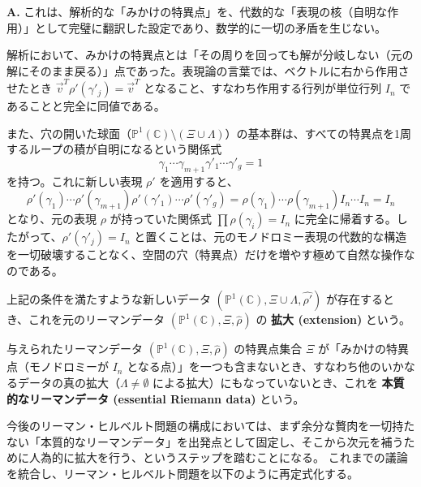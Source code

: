 \begin{Q}[【核心】新しく追加した点に対する表現を $\rho'(\gamma'_{j}) = I_{n}$ と設定することは、代数的にどのような意味を持つか？また、これは元の表現と矛盾しないか？]
\textbf{A.} これは、解析的な「みかけの特異点」を、代数的な「表現の核（自明な作用）」として完璧に翻訳した設定であり、数学的に一切の矛盾を生じない。

解析において、みかけの特異点とは「その周りを回っても解が分岐しない（元の解にそのまま戻る）」点であった。表現論の言葉では、ベクトルに右から作用させたとき $\vec{v}^T \rho'(\gamma'_j) = \vec{v}^T$ となること、すなわち作用する行列が単位行列 $I_n$ であることと完全に同値である。

また、穴の開いた球面（$\mathbb{P}^{1}(\mathbb{C})\setminus (\Xi\cup\Lambda)$）の基本群は、すべての特異点を1周するループの積が自明になるという関係式
\[
\gamma_{1} \cdots \gamma_{m+1} \gamma'_{1} \cdots \gamma'_{g} = 1
\]
を持つ。これに新しい表現 $\rho'$ を適用すると、
\[
\rho'(\gamma_{1}) \cdots \rho'(\gamma_{m+1}) \rho'(\gamma'_{1}) \cdots \rho'(\gamma'_{g}) = \rho(\gamma_{1}) \cdots \rho(\gamma_{m+1}) I_{n} \cdots I_{n} = I_{n}
\]
となり、元の表現 $\rho$ が持っていた関係式 $\prod \rho(\gamma_i) = I_n$ に完全に帰着する。したがって、$\rho'(\gamma'_j) = I_n$ と置くことは、元のモノドロミー表現の代数的な構造を一切破壊することなく、空間の穴（特異点）だけを増やす極めて自然な操作なのである。
\end{Q}

\begin{definition}[リーマンデータの拡大]
    上記の条件を満たすような新しいデータ $(\mathbb{P}^{1}(\mathbb{C}),\Xi\cup\Lambda,\hat{\rho'})$ が存在するとき、これを元のリーマンデータ $(\mathbb{P}^{1}(\mathbb{C}),\Xi,\hat{\rho})$ の \textbf{拡大 (extension)} という。
\end{definition}

\begin{definition}[本質的なリーマンデータ]
    与えられたリーマンデータ $(\mathbb{P}^{1}(\mathbb{C}),\Xi,\hat{\rho})$ の特異点集合 $\Xi$ が「みかけの特異点（モノドロミーが $I_n$ となる点）」を一つも含まないとき、すなわち他のいかなるデータの真の拡大（$\Lambda \neq \emptyset$ による拡大）にもなっていないとき、これを \textbf{本質的なリーマンデータ (essential Riemann data)} という。
\end{definition}

今後のリーマン・ヒルベルト問題の構成においては、まず余分な贅肉を一切持たない「本質的なリーマンデータ」を出発点として固定し、そこから次元を補うために人為的に拡大を行う、というステップを踏むことになる。
これまでの議論を統合し、リーマン・ヒルベルト問題を以下のように再定式化する。

